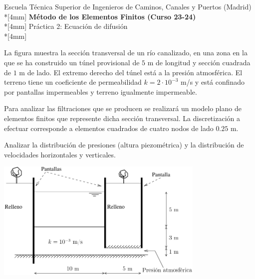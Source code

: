 \documentclass[a4paper,12pt]{article}
\begin{document}
\mbox{}\vspace*{-45mm}

{\centering
{\small\sc Escuela Técnica Superior de Ingenieros de Caminos, Canales y
Puertos (Madrid)}\\*[4mm]
{\Large\bf Método de los Elementos Finitos (Curso 23-24)}\\*[4mm]
Práctica 2: Ecuación de difusión \\*[4mm]
}

\vspace{3mm}

\noindent
La figura muestra la sección transversal de un río canalizado, en una zona en la que se ha construido un túnel provisional de $5$ m de longitud y sección cuadrada de $1$ m de lado. El extremo derecho del túnel está a la presión atmosférica. El terreno tiene un coeficiente de permeabilidad $k=2\cdot10^{-3}$ m/s y está confinado por pantallas impermeables y terreno igualmente impermeable.

Para analizar las filtraciones que se producen se realizará un modelo plano de elementos finitos que represente dicha sección transversal. La discretización a efectuar corresponde a elementos cuadrados de cuatro
nodos de lado $0.25$ m.

Analizar la distribución de presiones (altura piezométrica) y la distribución de velocidades horizontales y verticales.

\begin{center}
\includegraphics[width=0.75\textwidth]{practi2}
\end{center}
\end{document}
